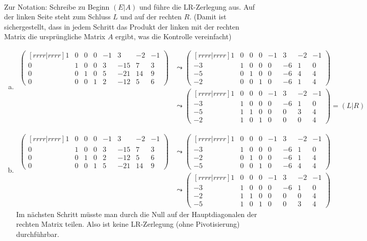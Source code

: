 \documentclass[a4paper]{scrartcl}
\begin{document}
\begin{aufgabe}\\
	Zur Notation: Schreibe zu Beginn $(E|A)$ und führe die LR-Zerlegung aus.
	Auf der linken Seite steht zum Schluss $L$ und auf der rechten $R$.
	(Damit ist sichergestellt, dass in jedem Schritt das Produkt der linken mit der rechten Matrix die ursprüngliche Matrix $A$ ergibt, was die Kontrolle vereinfacht)
	\begin{enumerate}[a)]
		\item
			\begin{align*}
				\begin{pmatrix}[rrrr|rrrr]
					1&0&0&0  &-1&3&-2&-1\\
					0&1&0&0  &3&-15&7&3\\
					0&0&1&0  &5&-21&14&9\\
					0&0&0&1  &2&-12&5&6
	 \end{pmatrix}&\leadsto
				\begin{pmatrix}[rrrr|rrrr]
					1&0&0&0  &-1&3&-2&-1\\
				-3&1&0&0  &0&-6&1&0\\
				-5&0&1&0  &0&-6&4&4\\
				-2&0&0&1  &0&-6&1&4
				\end{pmatrix}\\
				&\leadsto
				\begin{pmatrix}[rrrr|rrrr]
					1&0&0&0  &-1&3&-2&-1\\
				-3&1&0&0  &0&-6&1&0\\
				-5&1&1&0  &0&0&3&4\\
				-2&1&0&1  &0&0&0&4
				\end{pmatrix}=(L|R)
			\end{align*}
		\item
			\begin{align*}
				\begin{pmatrix}[rrrr|rrrr]
					1&0&0&0  &-1&3&-2&-1\\
					0&1&0&0  &3&-15&7&3\\
					0&0&1&0  &2&-12&5&6\\
					0&0&0&1  &5&-21&14&9
	 \end{pmatrix}&\leadsto
				\begin{pmatrix}[rrrr|rrrr]
					1&0&0&0  &-1&3&-2&-1\\
				-3&1&0&0  &0&-6&1&0\\
				-2&0&1&0  &0&-6&1&4\\
				-5&0&0&1  &0&-6&4&4
				\end{pmatrix}\\
				&\leadsto
				\begin{pmatrix}[rrrr|rrrr]
					1&0&0&0  &-1&3&-2&-1\\
				-3&1&0&0  &0&-6&1&0\\
				-2&1&1&0  &0&0&0&4\\
				-5&1&0&1  &0&0&3&4
				\end{pmatrix}
			\end{align*}
			Im nächsten Schritt müsste man durch die Null auf der Hauptdiagonalen der rechten Matrix teilen.
			Also ist keine LR-Zerlegung (ohne Pivotisierung) durchführbar.
	\end{enumerate}
\end{aufgabe}
\end{document}
